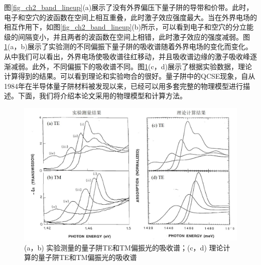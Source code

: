 图\ref{fig_ch2_band_lineup}(a)展示了没有外界偏压下量子阱的导带和价带。此时，电子和空穴的波函数在空间上相互重叠，此时激子效应强度最大。当在外界电场的相互作用下，如图\ref{fig_ch2_band_lineup}(b)所示，可以看到电子和空穴的分立能级的间隔变小，并且两者的波函数在空间上相错，此时激子效应的强度减弱。图\ref{fig_ch2_absorption_spec}(a，b)展示了实验测的不同偏振下量子阱的吸收谱随着外界电场的变化而变化\cite{chao1993momentum}。从中我们可以看出，外界电场使吸收谱往红移动，并且吸收谱边缘的激子吸收峰逐渐减弱。此外，不同偏振下的吸收谱不同。图\ref{fig_ch2_absorption_spec}(c，d)展示了根据实验数据，理论计算得到的结果\cite{chao1993momentum}。可以看到理论和实验吻合的很好。量子阱中的QCSE现象，自从1984年在半导体量子阱材料被发现以来\cite{miller1984band, wood1984high}，已经可以用多套完整的物理模型进行描述\cite{chuang1995physics}。下面，我们将介绍本论文采用的物理模型和计算方法。
\begin{figure}[htb]
	\centering
	\includegraphics[width=14cm]{./Pictures/fig_ch2_absorption_spec.jpg}
	\caption{ (a，b) 实验测量的量子阱TE和TM偏振光的吸收谱\cite{chao1993momentum}；(c，d) 理论计算的量子阱TE和TM偏振光的吸收谱\cite{chao1993momentum}}
	\label{fig_ch2_absorption_spec}
\end{figure}

